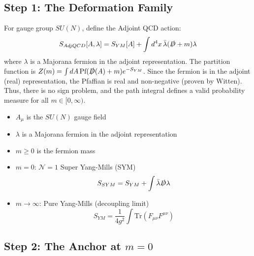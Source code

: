 \subsection{Step 1: The Deformation Family}

\begin{definition}
\label{def:adjoint-qcd-app112}
For gauge group $SU(N)$, define the Adjoint QCD action:
\begin{equation}
S_{AdjQCD}[A, \lambda] = S_{YM}[A] + \int d^4x \, \bar{\lambda} (\slashed{D} + m) \lambda
\end{equation}
where $\lambda$ is a Majorana fermion in the adjoint representation.
The partition function is $Z(m) = \int dA \, \text{Pf}(\slashed{D}(A) + m) e^{-S_{YM}}$.
Since the fermion is in the adjoint (real) representation, the Pfaffian is real and non-negative (proven by Witten). Thus, there is no sign problem, and the path integral defines a valid probability measure for all $m \in [0, \infty)$.
\end{definition}
\begin{itemize}
\item $A_\mu$ is the $SU(N)$ gauge field
\item $\lambda$ is a Majorana fermion in the adjoint representation
\item $m \geq 0$ is the fermion mass
\end{itemize}

\begin{definition}
\label{def:limits}
\begin{itemize}
\item \textbf{$m = 0$}: $\mathcal{N}=1$ Super Yang-Mills (SYM)
\begin{equation}
S_{SYM} = S_{YM} + \int \bar{\lambda} \slashed{D} \lambda
\end{equation}
\item \textbf{$m \to \infty$}: Pure Yang-Mills (decoupling limit)
\begin{equation}
S_{YM} = \frac{1}{4g^2} \int \mathrm{Tr}(F_{\mu\nu} F^{\mu\nu})
\end{equation}
\end{itemize}
\end{definition}

\subsection{Step 2: The Anchor at \texorpdfstring{$m = 0$}{m = 0}}

